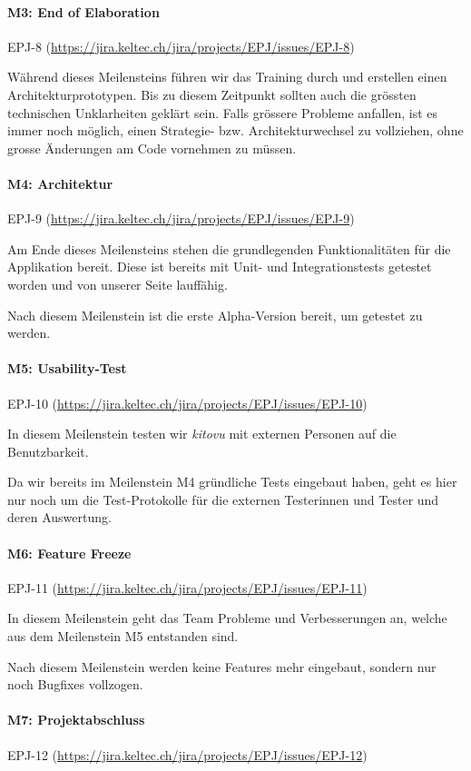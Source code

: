 \documentclass[a4paper]{article}
\def\jiraurl{https://jira.keltec.ch/jira}
\newcommand{\fulljiraissue}[1]{EPJ-#1 (\url{\jiraurl/projects/EPJ/issues/EPJ-#1})}
\begin{document}
\paragraph{M3: End of Elaboration} \fulljiraissue{8}

Während dieses Meilensteins führen wir das Training durch und erstellen einen Architekturprototypen. Bis zu diesem Zeitpunkt sollten auch die grössten technischen Unklarheiten geklärt sein. Falls grössere Probleme anfallen, ist es immer noch möglich, einen Strategie- bzw. Architekturwechsel zu vollziehen, ohne grosse Änderungen am Code vornehmen zu müssen.

\paragraph{M4: Architektur} \fulljiraissue{9}

Am Ende dieses Meilensteins stehen die grundlegenden Funktionalitäten für die Applikation bereit. Diese ist bereits mit Unit- und Integrationstests getestet worden und von unserer Seite lauffähig.

Nach diesem Meilenstein ist die erste Alpha-Version bereit, um getestet zu werden.

\paragraph{M5: Usability-Test} \fulljiraissue{10}

In diesem Meilenstein testen wir \emph{kitovu} mit externen Personen auf die Benutzbarkeit.

Da wir bereits im Meilenstein M4 gründliche Tests eingebaut haben, geht es hier nur noch um die Test-Protokolle für die externen Testerinnen und Tester und deren Auswertung.

\paragraph{M6: Feature Freeze} \fulljiraissue{11}

In diesem Meilenstein geht das Team Probleme und Verbesserungen an, welche aus dem Meilenstein M5 entstanden sind.

Nach diesem Meilenstein werden keine Features mehr eingebaut, sondern nur noch Bugfixes vollzogen.

\paragraph{M7: Projektabschluss} \fulljiraissue{12}
\end{document}
